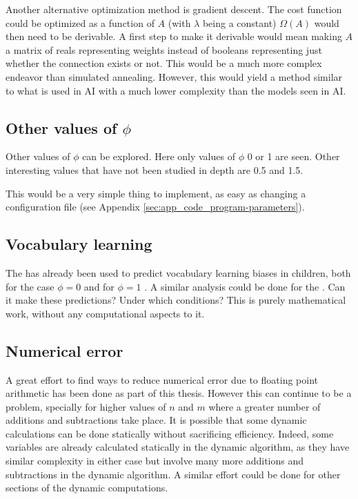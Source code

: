 Another alternative optimization method is gradient descent.
The cost function could be optimized as a function of $A$ (with $\lambda$ being a constant) $\Omega(A)$ would then need to be derivable.
A first step to make it derivable would mean making $A$ a matrix of reals representing weights instead of booleans representing just whether the connection exists or not.
This would be a much more complex endeavor than simulated annealing.
However, this would yield a method similar to what is used in AI with a much lower complexity than the models seen in AI.

\subsection{Other values of $\phi$}
\label{sec:discussion_future-work_phi}

Other values of $\phi$ can be explored.
Here only values of $\phi$ 0 or 1 are seen.
Other interesting values that have not been studied in depth are 0.5 and 1.5.

This would be a very simple thing to implement, as easy as changing a configuration file (see Appendix \ref{sec:app_code_program-parameters}).

\subsection{Vocabulary learning}
\label{sec:discussion_future-work_vocabulary-learning}

The \firstmodel{} has already been used to predict vocabulary learning biases in children, both for the case $\phi=0$ \cite{Ferrer2017a} and for $\phi=1$ \cite{Carrera2021a}.
A similar analysis could be done for the \secondmodel{}.
Can it make these predictions? Under which conditions? This is purely mathematical work, without any computational aspects to it.

\subsection{Numerical error}
\label{sec:discussion_future-work_numerical-error}

A great effort to find ways to reduce numerical error due to floating point arithmetic has been done as part of this thesis.
However this can continue to be a problem, specially for higher values of $n$ and $m$ where a greater number of additions and subtractions take place.
It is possible that some dynamic calculations can be done statically without sacrificing efficiency.
Indeed, some variables are already calculated statically in the dynamic algorithm, as they have similar complexity in either case but involve many more additions and subtractions in the dynamic algorithm.
A similar effort could be done for other sections of the dynamic computations.

